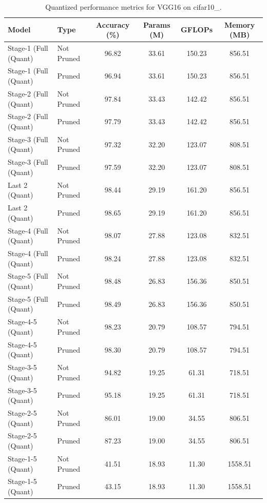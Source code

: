 \begin{table}
\caption{Quantized performance metrics for VGG16 on cifar10_.}
\label{tab:VGG16_cifar10__quant}
\begin{tabular}{llcccc}
\toprule
Model & Type & Accuracy (\%) & Params (M) & GFLOPs & Memory (MB) \\
\midrule
Stage-1 (Full
(Quant) & Not Pruned & 96.82 & 33.61 & 150.23 & 856.51 \\
Stage-1 (Full
(Quant) & Pruned & 96.94 & 33.61 & 150.23 & 856.51 \\
Stage-2 (Full
(Quant) & Not Pruned & 97.84 & 33.43 & 142.42 & 856.51 \\
Stage-2 (Full
(Quant) & Pruned & 97.79 & 33.43 & 142.42 & 856.51 \\
Stage-3 (Full
(Quant) & Not Pruned & 97.32 & 32.20 & 123.07 & 808.51 \\
Stage-3 (Full
(Quant) & Pruned & 97.59 & 32.20 & 123.07 & 808.51 \\
Last 2
(Quant) & Not Pruned & 98.44 & 29.19 & 161.20 & 856.51 \\
Last 2
(Quant) & Pruned & 98.65 & 29.19 & 161.20 & 856.51 \\
Stage-4 (Full
(Quant) & Not Pruned & 98.07 & 27.88 & 123.08 & 832.51 \\
Stage-4 (Full
(Quant) & Pruned & 98.24 & 27.88 & 123.08 & 832.51 \\
Stage-5 (Full
(Quant) & Not Pruned & 98.48 & 26.83 & 156.36 & 850.51 \\
Stage-5 (Full
(Quant) & Pruned & 98.49 & 26.83 & 156.36 & 850.51 \\
Stage-4-5
(Quant) & Not Pruned & 98.23 & 20.79 & 108.57 & 794.51 \\
Stage-4-5
(Quant) & Pruned & 98.30 & 20.79 & 108.57 & 794.51 \\
Stage-3-5
(Quant) & Not Pruned & 94.82 & 19.25 & 61.31 & 718.51 \\
Stage-3-5
(Quant) & Pruned & 95.18 & 19.25 & 61.31 & 718.51 \\
Stage-2-5
(Quant) & Not Pruned & 86.01 & 19.00 & 34.55 & 806.51 \\
Stage-2-5
(Quant) & Pruned & 87.23 & 19.00 & 34.55 & 806.51 \\
Stage-1-5
(Quant) & Not Pruned & 41.51 & 18.93 & 11.30 & 1558.51 \\
Stage-1-5
(Quant) & Pruned & 43.15 & 18.93 & 11.30 & 1558.51 \\
\bottomrule
\end{tabular}
\end{table}

